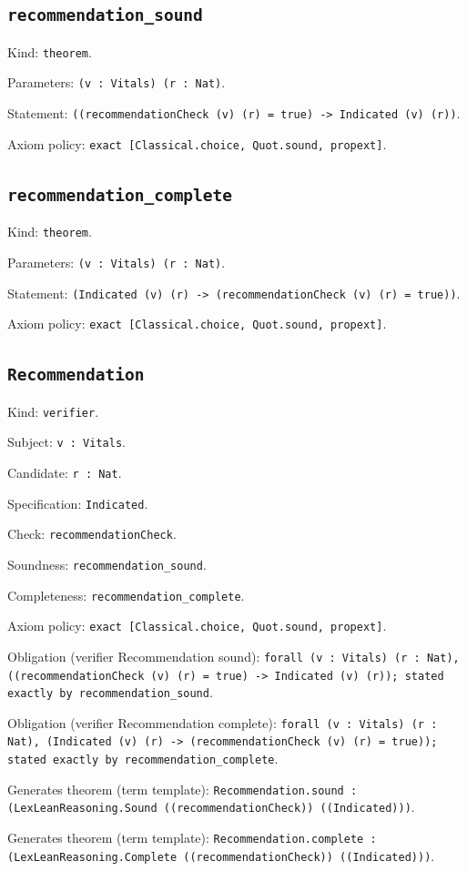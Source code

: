 \documentclass[11pt]{article}
\begin{document}
\subsection*{\texttt{recommendation\_sound}}
\noindent Kind: \texttt{theorem}.\par
\noindent Parameters: \texttt{(v : Vitals) (r : Nat)}.\par
\noindent Statement: \texttt{((recommendationCheck (v) (r) = true) -> Indicated (v) (r))}.\par
\noindent Axiom policy: \texttt{exact [Classical.choice, Quot.sound, propext]}.\par
\subsection*{\texttt{recommendation\_complete}}
\noindent Kind: \texttt{theorem}.\par
\noindent Parameters: \texttt{(v : Vitals) (r : Nat)}.\par
\noindent Statement: \texttt{(Indicated (v) (r) -> (recommendationCheck (v) (r) = true))}.\par
\noindent Axiom policy: \texttt{exact [Classical.choice, Quot.sound, propext]}.\par
\subsection*{\texttt{Recommendation}}
\noindent Kind: \texttt{verifier}.\par
\noindent Subject: \texttt{v : Vitals}.\par
\noindent Candidate: \texttt{r : Nat}.\par
\noindent Specification: \texttt{Indicated}.\par
\noindent Check: \texttt{recommendationCheck}.\par
\noindent Soundness: \texttt{recommendation\_sound}.\par
\noindent Completeness: \texttt{recommendation\_complete}.\par
\noindent Axiom policy: \texttt{exact [Classical.choice, Quot.sound, propext]}.\par
\noindent Obligation (verifier Recommendation sound): \texttt{forall (v : Vitals) (r : Nat), ((recommendationCheck (v) (r) = true) -> Indicated (v) (r)); stated exactly by recommendation\_sound}.\par
\noindent Obligation (verifier Recommendation complete): \texttt{forall (v : Vitals) (r : Nat), (Indicated (v) (r) -> (recommendationCheck (v) (r) = true)); stated exactly by recommendation\_complete}.\par
\noindent Generates theorem (term template): \texttt{Recommendation.sound : (LexLeanReasoning.Sound ((recommendationCheck)) ((Indicated)))}.\par
\noindent Generates theorem (term template): \texttt{Recommendation.complete : (LexLeanReasoning.Complete ((recommendationCheck)) ((Indicated)))}.\par
\end{document}
